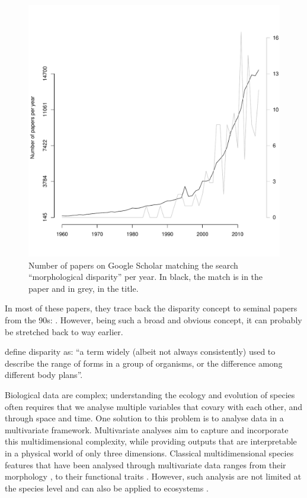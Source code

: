 \documentclass[12pt,letterpaper]{article}
\begin{document}
\begin{figure}[!htbp]
\centering
   \includegraphics[width=1\textwidth]{Figures/GoogleScholarOccurences.pdf} 
\caption{Number of papers on Google Scholar matching the search ``morphological disparity'' per year. In black, the match is in the paper and in grey, in the title.}
\label{Fig:GoogleOccurences}
\end{figure}

In most of these papers, they trace back the disparity concept to seminal papers from the 90s: \cite{gould1989wonderful,gould1991disparity,briggs1992morphological,Wills1994,Foote01071994,Foote29111996,jernvall1996molar,foote1997evolution}.
However, being such a broad and obvious concept, it can probably be stretched back to way earlier.

\cite{prentice2011} define disparity as: ``a term widely (albeit not always consistently) used to describe the range of forms in a group of organisms, or the difference among different body plans''.




Biological data are complex; understanding the ecology and evolution of species often requires that we analyse multiple variables that covary with each other, and through space and time.
One solution to this problem is to analyse data in a multivariate framework.
Multivariate analyses aim to capture and incorporate this multidimensional complexity, while providing outputs that are interpretable in a physical world of only three dimensions.
Classical multidimensional species features that have been analysed through multivariate data ranges from their morphology \citep{raup1966geometric}, to their functional traits \citep{diaz2016global}.
However, such analysis are not limited at the species level and can also be applied to ecosystems \citep{DonohueDim}.
\end{document}

